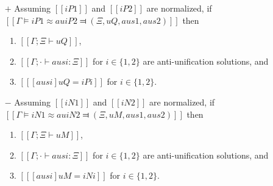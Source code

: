 \begin{lemma} \label{lemma:au-soundness}
    \hfill
    \begin{itemize}
        \item [$+$]  Assuming $[[iP1]]$ and $[[iP2]]$ are normalized,
        if $[[Γ ⊨ iP1 ≈au iP2 ⫤ (Ξ, uQ, aus1, aus2)]]$
        then 
        \begin{enumerate}
            \item $[[Γ ; Ξ ⊢ uQ]]$,
            \item $[[Γ ; · ⊢ ausi : Ξ]]$ for $i \in \{1,2\}$
            are anti-unification solutions, and
            \item $[[ [ausi] uQ = iPi ]]$ for $i \in \{1,2\}$.
        \end{enumerate}

        \item [$-$] Assuming $[[iN1]]$ and $[[iN2]]$ are normalized,
        if $[[Γ ⊨ iN1 ≈au iN2 ⫤ (Ξ, uM, aus1, aus2)]]$
        then
        \begin{enumerate}
            \item $[[Γ ; Ξ ⊢ uM]]$,
            \item $[[Γ ; · ⊢ ausi : Ξ]]$ for $i \in \{1,2\}$
            are anti-unification solutions, and
            \item $[[ [ausi] uM = iNi ]]$ for $i \in \{1,2\}$.
        \end{enumerate}
    \end{itemize}
\end{lemma}
